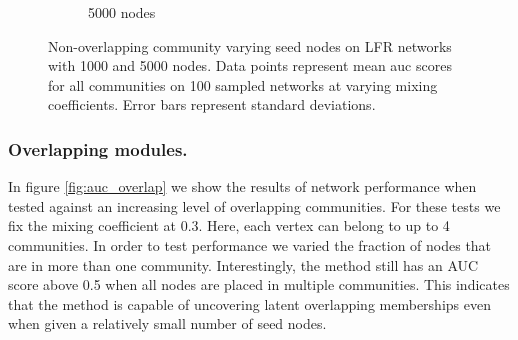 \documentclass[sigconf]{acmart}
\begin{document}
\begin{figure}[ht]
\begin{subfigure}[b]{0.48\textwidth}
        \caption{5000 nodes}
    \end{subfigure}
    \caption{Non-overlapping community varying seed nodes on LFR networks with 1000 and 5000 nodes.
     Data points represent mean auc scores for all communities on 100 sampled networks at varying mixing coefficients.
     Error bars represent standard deviations.}
     \label{fig:auc_no_overlap}
\end{figure}

\subsubsection{Overlapping modules.} 
In figure \ref{fig:auc_overlap} we show the results of network performance when tested against an increasing level of overlapping communities.
For these tests we fix the mixing coefficient at $0.3$.
Here, each vertex can belong to up to 4 communities.
In order to test performance we varied the fraction of nodes that are in more than one community.
Interestingly, the method still has an AUC score above 0.5 when all nodes are placed in multiple communities.
This indicates that the method is capable of uncovering latent overlapping memberships even when given a relatively small number of seed nodes.
\end{document}
